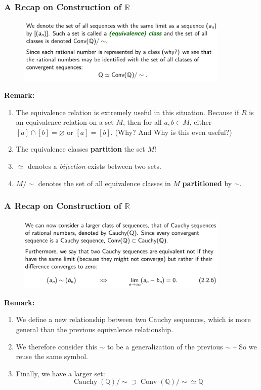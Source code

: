 \documentclass[10pt, t]{beamer}
\renewcommand{\emph}[1]{{\color{themecolor}\textsl{#1}}}
\newcommand{\R}{\mathbb{R}}
\renewcommand{\emptyset}{\varnothing}
\begin{document}
\begin{frame}
    \frametitle{A Recap on Construction of $\R$}
\begin{figure}[H]
        \centering
        \includegraphics[width=0.9\textwidth]{2020-10-13-21-11-42.png}
    \end{figure}
    \textbf{Remark:} 
    \begin{enumerate}
        \item The equivalence relation is extremely useful in this situation. Because if $R$ is an equivalence relation on a set $M$, then for all $a,b\in M$, either $[a]\cap [b]=\emptyset$ or $[a]=[b]$. (Why? And Why is this even useful?)
        \item The equivalence classes \textbf{partition} the set $M$!
        \item $\simeq $ denotes a \emph{bijection} exists between two sets.
        \item $M/\sim$ denotes the set of all equivalence classes in $M$ \textbf{partitioned} by $\sim$.
    \end{enumerate}
\end{frame}

\begin{frame}
    \frametitle{A Recap on Construction of $\R$}
\begin{figure}[H]
        \centering
        \includegraphics[width=0.9\textwidth]{2020-10-13-21-18-29.png}
    \end{figure}
    \textbf{Remark:} 
    \begin{enumerate}
        \item We define a new relationship between two Cauchy sequences, which is more general than the previous equivalence relationship.
        \item We therefore consider this $\sim$ to be a generalization of the previous $\sim$ -- So we reuse the same symbol.
        \item Finally, we have a larger set:
        $$\operatorname{Cauchy}(\mathbb{Q}) / \sim \supset \operatorname{Conv}(\mathbb{Q}) / \sim \simeq \mathbb{Q}$$
    \end{enumerate}
\end{frame}
\end{document}
